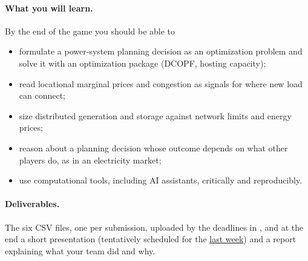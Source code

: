 \documentclass[10pt]{article}
\newcommand{\alert}[1]{{\color{alertblue}\uline{#1}}}
\begin{document}
\paragraph{What you will learn.} By the end of the game you should be able to
\begin{itemize}[leftmargin=*]
  \item formulate a power-system planning decision as an optimization problem
    and solve it with an optimization package (DCOPF, hosting capacity);
  \item read locational marginal prices and congestion as signals for where
    new load can connect;
  \item size distributed generation and storage against network limits and
    energy prices;
  \item reason about a planning decision whose outcome depends on what other
    players do, as in an electricity market;
  \item use computational tools, including AI assistants, critically and
    reproducibly.
\end{itemize}

\paragraph{Deliverables.} The six CSV files, one per submission, uploaded by the
deadlines in , and at the end a short presentation (tentatively scheduled for the \alert{last week}) and a
report explaining what your team did and why.
\end{document}
